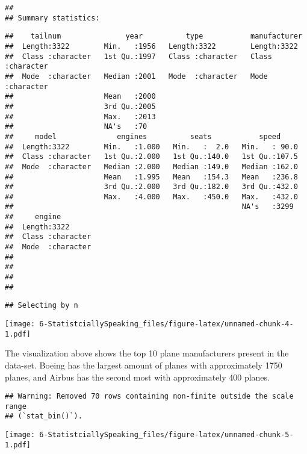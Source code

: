 \documentclass[
]{article}
\begin{document}
\begin{verbatim}
## 
## Summary statistics:
\end{verbatim}

\begin{verbatim}
##    tailnum               year          type           manufacturer      
##  Length:3322        Min.   :1956   Length:3322        Length:3322       
##  Class :character   1st Qu.:1997   Class :character   Class :character  
##  Mode  :character   Median :2001   Mode  :character   Mode  :character  
##                     Mean   :2000                                        
##                     3rd Qu.:2005                                        
##                     Max.   :2013                                        
##                     NA's   :70                                          
##     model              engines          seats           speed      
##  Length:3322        Min.   :1.000   Min.   :  2.0   Min.   : 90.0  
##  Class :character   1st Qu.:2.000   1st Qu.:140.0   1st Qu.:107.5  
##  Mode  :character   Median :2.000   Median :149.0   Median :162.0  
##                     Mean   :1.995   Mean   :154.3   Mean   :236.8  
##                     3rd Qu.:2.000   3rd Qu.:182.0   3rd Qu.:432.0  
##                     Max.   :4.000   Max.   :450.0   Max.   :432.0  
##                                                     NA's   :3299   
##     engine         
##  Length:3322       
##  Class :character  
##  Mode  :character  
##                    
##                    
##                    
## 
\end{verbatim}

\begin{verbatim}
## Selecting by n
\end{verbatim}

\texttt{[image: 6-StatistciallySpeaking\_files/figure-latex/unnamed-chunk-4-1.pdf]}

The visualization above shows the top 10 plane manufacturers present in
the data-set. Boeing has the largest amount of planes with approximately
1750 planes, and Airbus has the second most with approximately 400
planes.

\begin{verbatim}
## Warning: Removed 70 rows containing non-finite outside the scale range
## (`stat_bin()`).
\end{verbatim}

\texttt{[image: 6-StatistciallySpeaking\_files/figure-latex/unnamed-chunk-5-1.pdf]}
\end{document}
